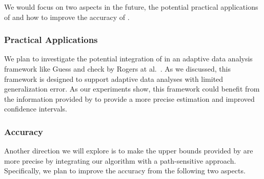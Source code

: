 We would focus on two aspects in the future, the potential practical applications  of {\THESYSTEM} and how to improve the
accuracy of {\THESYSTEM}.
%

\subsubsection{Practical Applications}
\label{sec:future-adapt-application}
We plan to investigate the potential integration of {\THESYSTEM} in an adaptive data analysis framework like Guess and check by Rogers at al.~\cite{RogersRSSTW20}. As we discussed, this framework is designed to support adaptive data analyses with limited generalization error. As our experiments show, this framework could benefit from the information provided by {\THESYSTEM} to provide a more precise estimation and improved confidence intervals. 

\subsubsection{Accuracy}
\label{sec:future-adapt-accuracy}
Another direction we will explore is to make 
the upper bounds provided by {\THESYSTEM} are more precise by integrating our algorithm with a path-sensitive approach.
Specifically, we plan to improve the accuracy from the following two aspects.

